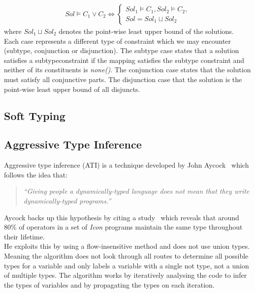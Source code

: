 \documentclass[12pt, titlepage]{article}
\begin{document}
\begin{align*} 
	Sol \models C_1 \lor C_2 \iff \begin{cases} Sol_1 \models C_1, Sol_2 \models C_2, \\
	                                            Sol = Sol_1 \sqcup Sol_2 \end{cases}
\end{align*}
where $Sol_1 \sqcup Sol_2$ denotes the point-wise least upper bound of the solutions. \\
Each case represents a different type of constraint which we may encounter (subtype, conjunction or disjunction). The subtype case states that a solution satisfies a subtypeconstraint if the mapping satisfies the subtype constraint and neither of its constituents is \textit{none()}. The conjunction case states that the solution must satisfy all conjunctive parts. The disjunction case that the solution is the point-wise least upper bound of all disjuncts.

\subsection{Soft Typing}

\subsection{Aggressive Type Inference}
Aggressive type inference (ATI) is a technique developed by John Aycock~\cite{aggressiveType} which follows the idea that:
\begin{quote}
	\emph{``Giving people a dynamically-typed language does not mean that they write dynamically-typed programs.''}
\end{quote}
Aycock backs up this hypothesis by citing a study~\cite{typeInferenceIcon} which reveals that around 80\% of operators in a set of \textit{Icon} programs maintain the same type throughout their lifetime. \\
He exploits this by using a flow-insensitive method and does not use union types. Meaning the algorithm does not look through all routes to determine all possible types for a variable and only labels a variable with a single not type, not a union of multiple types. The algorithm works by iteratively analysing the code to infer the types of variables and by propagating the types on each iteration.
\end{document}
